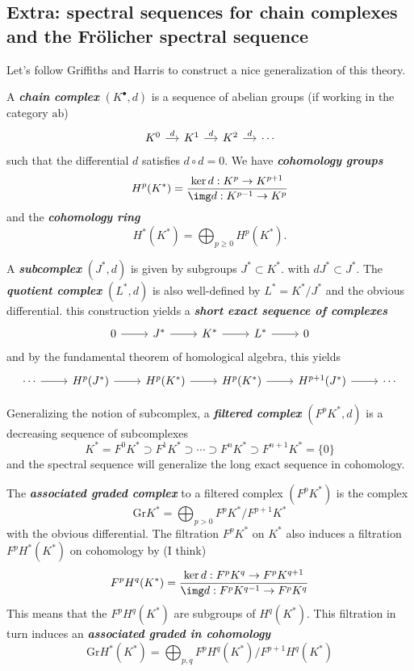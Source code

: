 \begin{remark}
\begin{definition}
\subsection{Extra: spectral sequences for chain complexes and the Fr\"olicher spectral sequence}
Let's follow Griffiths and Harris to construct a nice generalization of this theory.

A \textit{\textbf{chain complex}} $(K^\bullet,d)$ is a sequence of abelian groups (if working in the category $\text{ab}$)
$$\begin{tikzcd}[column sep=small]
	K^{0}\arrow[r,"d"]&K^{1}\arrow[r,"d"]&K^2\arrow[r,"d"]&\cdots
\end{tikzcd}$$
such that the differential $d$ satisfies $d\circ d=0$. We have \textit{\textbf{cohomology groups}} 
$$H^{p}(K^*)=\frac{\ker d:K^p\to K^{p+1}}{\img d:K^{p-1}\to K^p}$$
and the \textit{\textbf{cohomology ring}}
$$H^{*}(K^*)=\bigoplus_{p\geq 0} H^{p}(K^*).$$

A \textit{\textbf{subcomplex}} $(J^*,d)$ is given by subgroups $J^*\subset K^*$. with $dJ^*\subset J^*$. The \textit{\textbf{quotient complex}} $(L^*,d)$ is also well-defined by $L^*=K^*/J^*$ and the obvious differential. this construction yields a \textit{\textbf{short exact sequence of complexes}}
$$\begin{tikzcd}
	0\arrow[r]&J^*\arrow[r]&K^*\arrow[r]&L^*\arrow[r]&0
\end{tikzcd}$$
and by the fundamental theorem of homological algebra, this yields
$$\begin{tikzcd}
	\cdots\arrow[r]&H^{p}(J^*)\arrow[r]&H^{p}(K^*)\arrow[r]&H^{p}(K^*)\arrow[r]&H^{p+1}(J^*)\arrow[r]&\cdots
\end{tikzcd}$$

Generalizing the notion of subcomplex, a \textit{\textbf{filtered complex}} $(F^pK^*,d)$ is a decreasing sequence of subcomplexes
$$K^*=F^0K^*\supset F^1K^*\supset\cdots\supset F^nK^*\supset F^{n+1}K^*=\{0\}$$
and the spectral sequence will generalize the long exact sequence in cohomology.

The \textit{\textbf{associated graded complex}} to a filtered complex $ (F^pK^*)$ is the complex
$$\text{Gr}K^*=\bigoplus_{p>0} F^pK^*/F^{p+1}K^* $$
with the obvious differential. The filtration $F^pK^*$ on $K^*$ also induces a filtration $F^pH^*(K^*)$ on cohomology by {\color{blue}(I think)}
$$F^pH^q(K^*)=\frac{\ker d:F^pK^q\to F^pK^{q+1}}{\img d:F^pK^{q-1}\to F^pK^q}$$
This means that the $F^pH^q(K^*)$ are subgroups of $H^{q}(K^*)$. This filtration in turn induces an \textit{\textbf{associated graded in cohomology}}
$$\text{Gr}H^*(K^*)=\bigoplus_{p,q}F^pH^q(K^*)\big/F^{p+1}H^q(K^*)  $$


\end{definition}
\end{remark}
